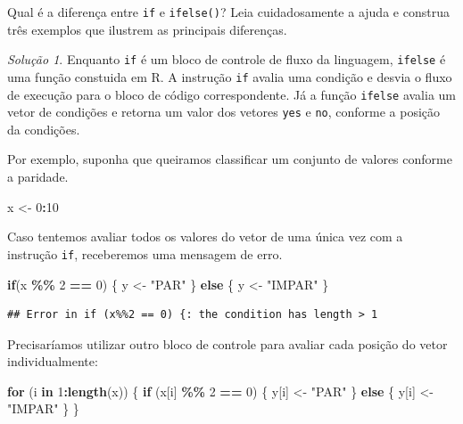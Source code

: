\documentclass[
]{latex/krantz}
\newenvironment{Shaded}{\begin{snugshade}}{\end{snugshade}}
\newcommand{\ControlFlowTok}[1]{\textcolor[rgb]{0.13,0.29,0.53}{\textbf{#1}}}
\newcommand{\DecValTok}[1]{\textcolor[rgb]{0.00,0.00,0.81}{#1}}
\newcommand{\FunctionTok}[1]{\textcolor[rgb]{0.13,0.29,0.53}{\textbf{#1}}}
\newcommand{\NormalTok}[1]{#1}
\newcommand{\OtherTok}[1]{\textcolor[rgb]{0.56,0.35,0.01}{#1}}
\newcommand{\SpecialCharTok}[1]{\textcolor[rgb]{0.81,0.36,0.00}{\textbf{#1}}}
\newcommand{\StringTok}[1]{\textcolor[rgb]{0.31,0.60,0.02}{#1}}
\theoremstyle{definition}
\theoremstyle{definition}
\theoremstyle{definition}
\theoremstyle{definition}
\theoremstyle{remark}
\newtheorem*{solution}{Solução}
\begin{document}
Qual é a diferença entre \texttt{if} e \texttt{ifelse()}? Leia cuidadosamente a ajuda e construa três exemplos que ilustrem as principais diferenças.

\begin{solution}

Enquanto \texttt{if} é um bloco de controle de fluxo da linguagem, \texttt{ifelse} é uma função constuida em R. A instrução \texttt{if} avalia uma condição e desvia o fluxo de execução para o bloco de código correspondente. Já a função \texttt{ifelse} avalia um vetor de condições e retorna um valor dos vetores \texttt{yes} e \texttt{no}, conforme a posição da condições.

Por exemplo, suponha que queiramos classificar um conjunto de valores conforme a paridade.

\begin{Shaded}
\begin{Highlighting}[]
\NormalTok{x }\OtherTok{\textless{}{-}} \DecValTok{0}\SpecialCharTok{:}\DecValTok{10}
\end{Highlighting}
\end{Shaded}

Caso tentemos avaliar todos os valores do vetor de uma única vez com a instrução \texttt{if}, receberemos uma mensagem de erro.

\begin{Shaded}
\begin{Highlighting}[]
\ControlFlowTok{if}\NormalTok{(x }\SpecialCharTok{\%\%} \DecValTok{2} \SpecialCharTok{==} \DecValTok{0}\NormalTok{) \{}
\NormalTok{  y }\OtherTok{\textless{}{-}} \StringTok{"PAR"}
\NormalTok{\} }\ControlFlowTok{else}\NormalTok{ \{}
\NormalTok{  y }\OtherTok{\textless{}{-}} \StringTok{"IMPAR"}
\NormalTok{\}}
\end{Highlighting}
\end{Shaded}

\begin{verbatim}
## Error in if (x%%2 == 0) {: the condition has length > 1
\end{verbatim}

Precisaríamos utilizar outro bloco de controle para avaliar cada posição do vetor individualmente:

\begin{Shaded}
\begin{Highlighting}[]
\ControlFlowTok{for}\NormalTok{ (i }\ControlFlowTok{in} \DecValTok{1}\SpecialCharTok{:}\FunctionTok{length}\NormalTok{(x)) \{}
  \ControlFlowTok{if}\NormalTok{ (x[i] }\SpecialCharTok{\%\%} \DecValTok{2} \SpecialCharTok{==} \DecValTok{0}\NormalTok{) \{}
\NormalTok{    y[i] }\OtherTok{\textless{}{-}} \StringTok{"PAR"}
\NormalTok{  \} }\ControlFlowTok{else}\NormalTok{ \{}
\NormalTok{    y[i] }\OtherTok{\textless{}{-}} \StringTok{"IMPAR"}
\NormalTok{  \}}
\NormalTok{\}}


\end{Highlighting}
\end{Shaded}
\end{solution}
\end{document}
